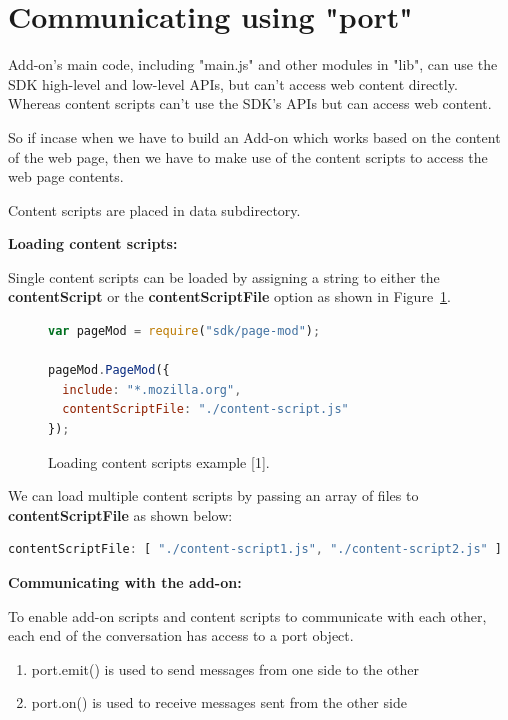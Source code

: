 \section{Communicating using "port"}

Add-on's main code, including "main.js" and other modules in "lib", can use the SDK high-level and low-level APIs, but can't access web content directly. Whereas content scripts can't use the SDK's APIs but can access web content.

So if incase when we have to build an Add-on which works based on the content of the web page, then we have to make use of the content scripts to access the web page contents.

Content scripts are placed in data subdirectory.


\textbf{Loading content scripts:}


Single content scripts can be loaded by assigning a string to either the \textbf{contentScript} or the \textbf{contentScriptFile} option as shown in Figure~\ref{fig:loadingcs}.
\begin{figure}[h]
  \centering
\begin{lstlisting}[language=JavaScript]
var pageMod = require("sdk/page-mod");

pageMod.PageMod({
  include: "*.mozilla.org",
  contentScriptFile: "./content-script.js"
});
\end{lstlisting}
    \caption[Loading content scripts example]{Loading content scripts example [1].}
    \label{fig:loadingcs}
\end{figure}


We can load multiple content scripts by passing an array of files to \textbf{contentScriptFile} as shown below:
\begin{lstlisting}[frame=none,numbers=none,language=JavaScript]
contentScriptFile: [ "./content-script1.js", "./content-script2.js" ]
\end{lstlisting}


\textbf{Communicating with the add-on:}

To enable add-on scripts and content scripts to communicate with each other, each end of the conversation has access to a port object.
\begin{enumerate}
\item port.emit() is used to send messages from one side to the other 
\item port.on() is used to receive messages sent from the other side
\end{enumerate}

